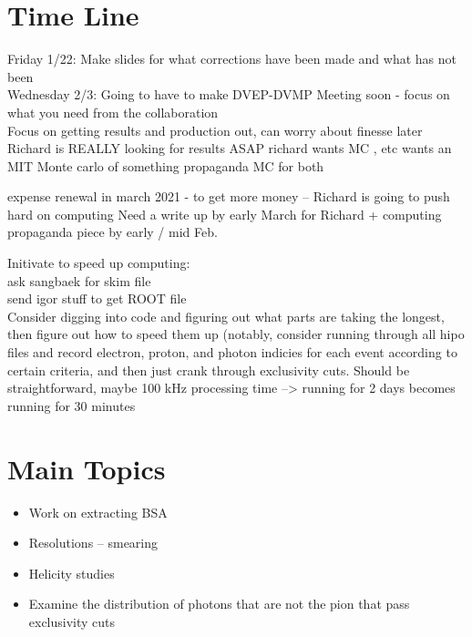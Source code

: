 \section{Time Line}
Friday 1/22: Make slides for what corrections have been made and what has not been \\
Wednesday 2/3: Going to have to make DVEP-DVMP Meeting soon - focus on what you need from the collaboration\\


Focus on getting results and production out, can worry about finesse later\\

Richard is REALLY looking for results ASAP
richard wants MC , etc
wants an MIT Monte carlo of something propaganda
MC for both

expense renewal in march 2021 - to get more money – Richard is going to push hard on computing
Need a write up by early March for Richard + computing propaganda piece by early / mid Feb.

Initivate to speed up computing:\\
ask sangbaek for skim file\\
send igor stuff to get ROOT file\\

Consider digging into code and figuring out what parts are taking the longest, then figure out how to speed them up
(notably, consider running through all hipo files and record electron, proton, and photon indicies for each event 
according to certain criteria, and then just crank through exclusivity cuts. Should be straightforward, maybe 
100 kHz processing time --> running for 2 days becomes running for 30 minutes

\section{Main Topics}
\begin{itemize}
    \item Work on extracting BSA
    \item Resolutions – smearing
    \item Helicity studies
    \item Examine the distribution of photons that are not the pion that pass exclusivity cuts
\end{itemize}


